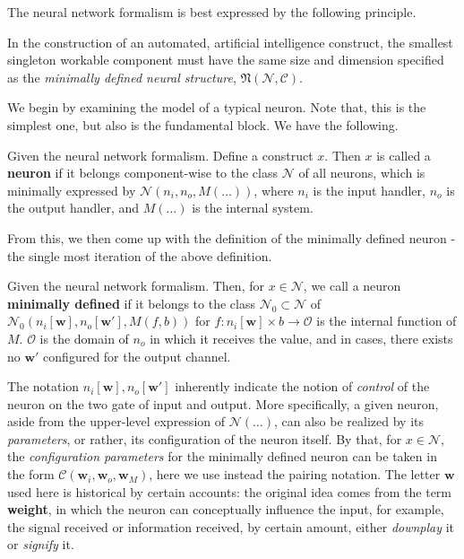 The neural network formalism is best expressed by the following principle. 

\begin{theorem}
    In the construction of an automated, artificial intelligence construct, the smallest singleton workable component must have the same size and dimension specified as the \textit{minimally defined neural structure}, $\mathfrak{N}(\mathcal{N},\mathcal{C})$. %
\end{theorem}

We begin by examining the model of a typical neuron. Note that, this is the simplest one, but also is the fundamental block. We have the following. 

\begin{definition}[Neuron]
    Given the neural network formalism. Define a construct $x$. Then $x$ is called a \textbf{neuron} if it belongs component-wise to the class $\mathcal{N}$ of all neurons, which is minimally expressed by $\mathcal{N}(n_{i},n_{o},M(\dots))$, where $n_{i}$ is the input handler, $n_{o}$ is the output handler, and $M(\dots)$ is the internal system. %
\end{definition}

From this, we then come up with the definition of the minimally defined neuron - the single most iteration of the above definition. 

\begin{definition}
    Given the neural network formalism. Then, for $x\in \mathcal{N}$, we call a neuron \textbf{minimally defined} if it belongs to the class $\mathcal{N}_{0}\subset \mathcal{N}$ of $\mathcal{N}_{0}(n_{i}[\mathbf{w}],n_{o}[\mathbf{w}'],M(f,b))$ for $f:n_{i}[\mathbf{w}]\times b \to \mathcal{O}$ is the internal function of $M$. $\mathcal{O}$ is the domain of $n_{o}$ in which it receives the value, and in cases, there exists no $\mathbf{w}'$ configured for the output channel. %
\end{definition}

The notation $n_{i}[\mathbf{w}], n_{o}[\mathbf{w}']$ inherently indicate the notion of \textit{control} of the neuron on the two gate of input and output. More specifically, a given neuron, aside from the upper-level expression of $\mathcal{N}(\dots)$, can also be realized by its \textit{parameters}, or rather, its configuration of the neuron itself. By that, for $x \in \mathcal{N}$, the \textit{configuration parameters} for the minimally defined neuron can be taken in the form $\mathcal{C}(\mathbf{w}_{i}, \mathbf{w}_{o}, \mathbf{w}_{M})$, here we use instead the pairing notation. The letter $\mathbf{w}$ used here is historical by certain accounts: the original idea comes from the term \textbf{weight}, in which the neuron can conceptually influence the input, for example, the signal received or information received, by certain amount, either \textit{downplay} it or \textit{signify} it.

